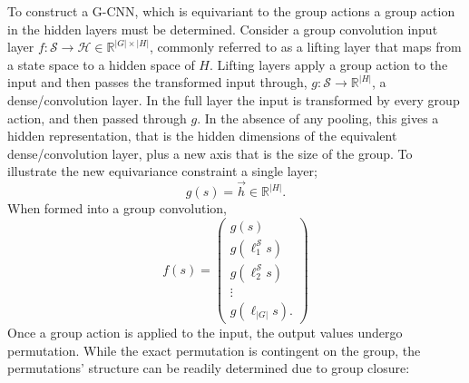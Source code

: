 %

To construct a G-CNN, which is equivariant to the group actions a group action in the hidden layers must be determined. Consider a group convolution input layer $f : \mathcal{S} \rightarrow \mathcal{H} \in \mathbb{R}^{|G| \times |H|}$, commonly referred to as a lifting layer that maps from a state space to a hidden space of $H$. Lifting layers apply a group action to the input and then passes the transformed input through, $ g: \mathcal{S} \rightarrow \mathbb{R}^{|H|}$, a dense/convolution layer. In the full layer the input is transformed by every group action, and then passed through $g$. In the absence of any pooling, this gives a hidden representation, that is the hidden dimensions of the equivalent dense/convolution layer, plus a new axis that is the size of the group. To illustrate the new equivariance constraint a single layer;
\begin{equation}
	g(s) = \vec{h} \in \mathbb{R}^{|H|}.
\end{equation}
When formed into a group convolution,
\begin{equation}
	f(s) = \begin{pmatrix}
		g(s)                   \\
		g(\ell_1^\mathcal{S}s) \\
		g(\ell^\mathcal{S}_2s) \\
		\vdots                 \\
		g(\ell_{|G|}s).
	\end{pmatrix}
\end{equation}
Once a group action is applied to the input, the output values undergo permutation. While the exact permutation is contingent on the group, the permutations' structure can be readily determined due to group closure:
